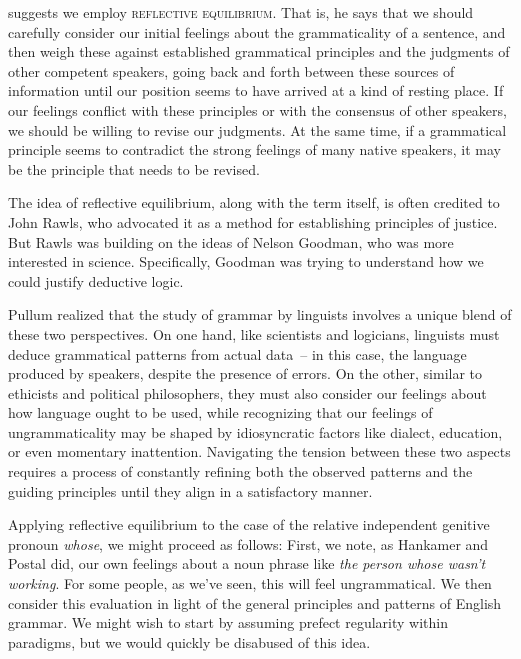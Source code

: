 \citet{Pullum2019a} suggests we employ \textsc{reflective equilibrium}. That is, he says that we should carefully consider our initial feelings about the grammaticality of a sentence, and then weigh these against established grammatical principles and the judgments of other competent speakers, going back and forth between these sources of information until our position seems to have arrived at a kind of resting place. If our feelings conflict with these principles or with the consensus of other speakers, we should be willing to revise our judgments. At the same time, if a grammatical principle seems to contradict the strong feelings of many native speakers, it may be the principle that needs to be revised.

The idea of reflective equilibrium, along with the term itself, is often credited to John Rawls, who advocated it as a method for establishing principles of justice. But Rawls was building on the ideas of Nelson Goodman, who was more interested in science. Specifically, Goodman was trying to understand how we could justify deductive logic.

Pullum realized that the study of grammar by linguists involves a unique blend of these two perspectives. On one hand, like scientists and logicians, linguists must deduce grammatical patterns from actual data~-- in this case, the language produced by speakers, despite the presence of errors. On the other, similar to ethicists and political philosophers, they must also consider our feelings about how language ought to be used, while recognizing that our feelings of ungrammaticality may be shaped by idiosyncratic factors like dialect, education, or even momentary inattention. Navigating the tension between these two aspects requires a process of constantly refining both the observed patterns and the guiding principles until they align in a satisfactory manner.

Applying reflective equilibrium to the case of the relative independent genitive pronoun \textit{whose}, we might proceed as follows: First, we note, as Hankamer and Postal did, our own feelings about a noun phrase like \textit{the person whose wasn't working}. For some people, as we've seen, this will feel ungrammatical. We then consider this evaluation in light of the general principles and patterns of English grammar. We might wish to start by assuming prefect regularity within paradigms, but we would quickly be disabused of this idea.

